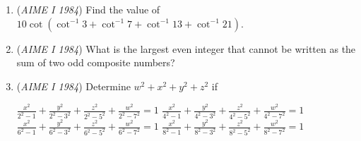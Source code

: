 \begin{enumerate}
 

	\item (\textit{AIME I 1984}) Find the value of $10\cot(\cot^{-1}3+\cot^{-1}7+\cot^{-1}13+\cot^{-1}21).$


	\item (\textit{AIME I 1984}) What is the largest even integer that cannot be written as the sum of two odd composite numbers?


 

	\item (\textit{AIME I 1984}) Determine $w^2+x^2+y^2+z^2$ if


 $\frac{x^2}{2^2-1}+\frac{y^2}{2^2-3^2}+\frac{z^2}{2^2-5^2}+\frac{w^2}{2^2-7^2}=1$
$\frac{x^2}{4^2-1}+\frac{y^2}{4^2-3^2}+\frac{z^2}{4^2-5^2}+\frac{w^2}{4^2-7^2}=1$
$\frac{x^2}{6^2-1}+\frac{y^2}{6^2-3^2}+\frac{z^2}{6^2-5^2}+\frac{w^2}{6^2-7^2}=1$
$\frac{x^2}{8^2-1}+\frac{y^2}{8^2-3^2}+\frac{z^2}{8^2-5^2}+\frac{w^2}{8^2-7^2}=1$


\end{enumerate}